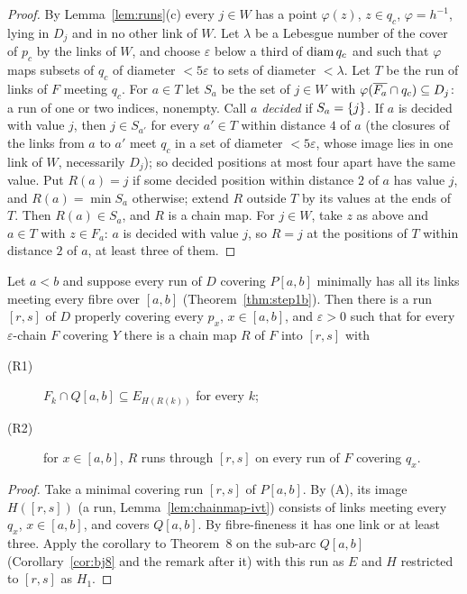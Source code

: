 \begin{proof}
By Lemma~\ref{lem:runs}(c) every $j\in W$ has a point $\varphi(z)$, $z\in q_c$, $\varphi=h^{-1}$, lying in $D_j$ and in no other link of $W$. Let $\lambda$ be a Lebesgue number of the
cover of $p_c$ by the links of $W$, and choose $\varepsilon$ below a third of $\operatorname{diam} q_c$ and such that $\varphi$ maps subsets of $q_c$ of diameter $<5\varepsilon$ to sets of
diameter $<\lambda$. Let $T$ be the run of links of $F$ meeting $q_c$. For $a\in T$ let $S_a$ be the set of $j\in W$ with $\varphi(\overline{F_a}\cap q_c)\subseteq D_j$: a run of one
or two indices, nonempty. Call $a$ \emph{decided} if $S_a=\left\{ j \right\}$. If $a$ is decided with value $j$, then $j\in S_{a'}$ for every $a'\in T$ within distance $4$ of $a$ (the
closures of the links from $a$ to $a'$ meet $q_c$ in a set of diameter $<5\varepsilon$, whose image lies in one link of $W$, necessarily $D_j$); so decided positions at most four
apart have the same value. Put $R(a)=j$ if some decided position within distance $2$ of $a$ has value $j$, and $R(a)=\min S_a$ otherwise; extend $R$ outside $T$ by its values at the
ends of $T$. Then $R(a)\in S_a$, and $R$ is a chain map. For $j\in W$, take $z$ as above and $a\in T$ with $z\in F_a$: $a$ is decided with value $j$, so $R=j$ at the
positions of $T$ within distance $2$ of $a$, at least three of them.
\end{proof}


\begin{lemma}\label{lem:subarc-piece}
Let $a<b$ and suppose every run of $D$ covering $P[a,b]$ minimally has all its links meeting every fibre over $[a,b]$ (Theorem~\ref{thm:step1b}). Then there is a run
$[r,s]$ of $D$ properly covering every $p_x$, $x\in[a,b]$, and $\varepsilon>0$ such that for every $\varepsilon$-chain $F$ covering $Y$ there is a chain map $R$ of $F$ into $[r,s]$
with
\begin{description}
\item[\textnormal{(R1)}] $F_k\cap Q[a,b]\subseteq E_{H(R(k))}$ for every $k$;
\item[\textnormal{(R2)}] for $x\in[a,b]$, $R$ runs through $[r,s]$ on every run of $F$ covering $q_x$.
\end{description}
\end{lemma}

\begin{proof}
Take a minimal covering run $[r,s]$ of $P[a,b]$. By (A), its image $H([r,s])$ (a run, Lemma~\ref{lem:chainmap-ivt}) consists of links meeting every $q_x$, $x\in[a,b]$, and covers
$Q[a,b]$. By fibre-fineness it has one link or at least three. Apply the corollary to Theorem~8 on the sub-arc $Q[a,b]$ (Corollary~\ref{cor:bj8} and the remark after
it) with this run as $E$ and $H$ restricted to $[r,s]$ as $H_1$.
\end{proof}


